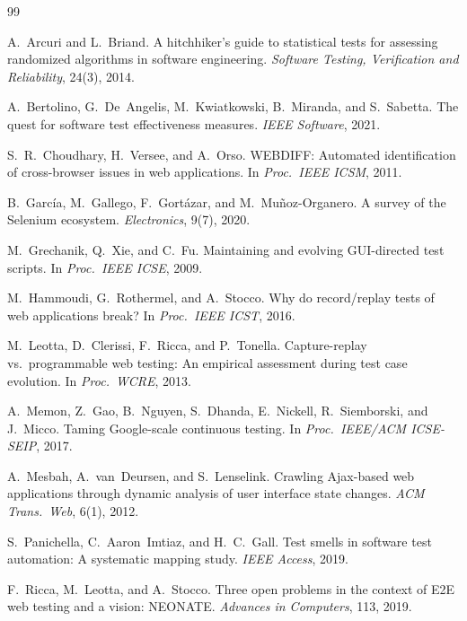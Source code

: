 \documentclass[conference]{IEEEtran}
\begin{document}

\begin{thebibliography}{99}

 A.~Arcuri and L.~Briand. A hitchhiker's guide to statistical tests for assessing randomized algorithms in software engineering. \emph{Software Testing, Verification and Reliability}, 24(3), 2014.

 A.~Bertolino, G.~De~Angelis, M.~Kwiatkowski, B.~Miranda, and S.~Sabetta. The quest for software test effectiveness measures. \emph{IEEE Software}, 2021.

 S.~R.~Choudhary, H.~Versee, and A.~Orso. {WEBDIFF}: Automated identification of cross-browser issues in web applications. In \emph{Proc.\ IEEE ICSM}, 2011.

 B.~Garc\'ia, M.~Gallego, F.~Gort\'azar, and M.~Mu\~noz-Organero. A survey of the {Selenium} ecosystem. \emph{Electronics}, 9(7), 2020.

 M.~Grechanik, Q.~Xie, and C.~Fu. Maintaining and evolving {GUI}-directed test scripts. In \emph{Proc.\ IEEE ICSE}, 2009.

 M.~Hammoudi, G.~Rothermel, and A.~Stocco. Why do record/replay tests of web applications break? In \emph{Proc.\ IEEE ICST}, 2016.

 M.~Leotta, D.~Clerissi, F.~Ricca, and P.~Tonella. Capture-replay vs.\ programmable web testing: An empirical assessment during test case evolution. In \emph{Proc.\ WCRE}, 2013.

 A.~Memon, Z.~Gao, B.~Nguyen, S.~Dhanda, E.~Nickell, R.~Siemborski, and J.~Micco. Taming {Google}-scale continuous testing. In \emph{Proc.\ IEEE/ACM ICSE-SEIP}, 2017.

 A.~Mesbah, A.~van~Deursen, and S.~Lenselink. Crawling {Ajax}-based web applications through dynamic analysis of user interface state changes. \emph{ACM Trans.\ Web}, 6(1), 2012.

 S.~Panichella, C.~Aaron~Imtiaz, and H.~C.~Gall. Test smells in software test automation: A systematic mapping study. \emph{IEEE Access}, 2019.

 F.~Ricca, M.~Leotta, and A.~Stocco. Three open problems in the context of {E2E} web testing and a vision: {NEONATE}. \emph{Advances in Computers}, 113, 2019.


\end{thebibliography}
\end{document}
